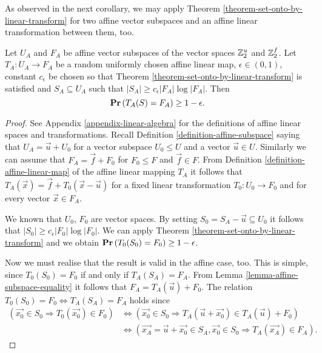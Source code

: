 As observed in the next corollary, we may apply Theorem \ref{theorem-set-onto-by-linear-transform} for two affine vector subspaces and an affine linear transformation between them, too.

\begin{corollary}
\label{corollary-affine-e2}
Let $U_A$ and $F_A$ be affine vector subspaces of the vector spaces $\mathbb{Z}_{2}^{u}$ and $\mathbb{Z}_{2}^{f}$. Let $T_A: U_A \rightarrow F_A$ be a random uniformly chosen affine linear map, $\epsilon \in (0, 1)$, constant $c_\epsilon$ be chosen so that Theorem \ref{theorem-set-onto-by-linear-transform} is satisfied and $S_A \subseteq U_A$ such that $|S_A| \geq c_\epsilon |F_A| \log |F_A|$. Then
\[
	\mathbf{Pr}\left(T_A(S) = F_A\right) \geq 1 - \epsilon \text{.}
\]
\end{corollary}
\begin{proof}
See Appendix \ref{appendix-linear-algebra} for the definitions of affine linear spaces and transformations. Recall Definition \ref{definition-affine-subspace} saying that $U_A = \vec{u} + U_0$ for a vector subspace $U_0 \leq U$ and a vector $\vec{u} \in U$. Similarly we can assume that $F_A = \vec{f} + F_0$ for $F_0 \leq F$ and $\vec{f} \in F$. From Definition \ref{definition-affine-linear-map} of the affine linear mapping $T_A$ it follows that $T_A(\vec{x}) = \vec{f} + T_0(\vec{x} - \vec{u})$ for a fixed linear transformation $T_0: U_0 \rightarrow F_0$ and for every vector $\vec{x} \in F_A$.

We known that $U_0$, $F_0$ are vector spaces. By setting $S_0 = S_A - \vec{u} \subseteq U_0$ it follows that $|S_0| \geq c_\epsilon |F_0| \log |F_0|$. We can apply Theorem \ref{theorem-set-onto-by-linear-transform} and we obtain $\mathbf{Pr}\left(T_0(S_0) = F_0\right) \geq 1 - \epsilon$.

Now we must realise that the result is valid in the affine case, too. This is simple, since $T_0(S_0) = F_0$ if and only if $T_A(S_A) = F_A$. From Lemma \ref{lemma-affine-subspace-equality} it follows that $F_A = T_A(\vec{u}) + F_0$. The relation $T_0(S_0) = F_0 \Leftrightarrow T_A(S_A) = F_A$ holds since
\[
\begin{split}
(\vec{x_0} \in S_0 \Rightarrow T_0(\vec{x_0}) \in F_0) 
	& \Leftrightarrow (\vec{x_0} \in S_0 \Rightarrow T_A(\vec{u} + \vec{x_0}) \in T_A(\vec{u}) + F_0) \\
	& \Leftrightarrow (\vec{x_A} = \vec{u} + \vec{x_0} \in S_A, \vec{x_0} \in S_0 \Rightarrow T_A(\vec{x_A}) \in F_A) \text{.}
\end{split}
\]
\end{proof}

